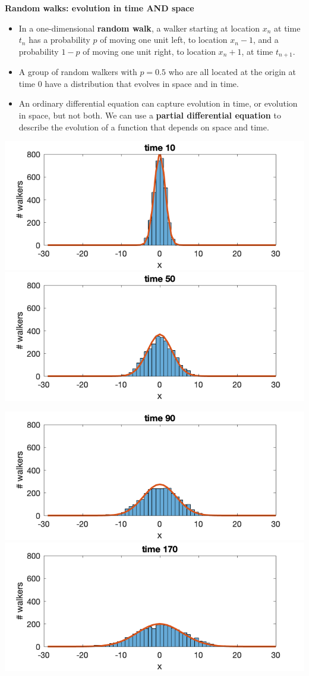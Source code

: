 \documentclass[12pt,letterpaper,noanswers]{exam}
\begin{document}
\noindent\textbf{Random walks: evolution in time AND space}
\begin{tcolorbox}
\begin{itemize}
\itemsep0em
    \item In a one-dimensional \textbf{random walk}, a walker starting at location $x_n$ at time $t_n$ has a probability $p$ of moving one unit left, to location $x_n - 1$, and a probability $1-p$ of moving one unit right, to location $x_n + 1$, at time $t_{n+1}$.
    \item A group of random walkers with $p=0.5$ who are all located at the origin at time $0$ have a distribution that evolves in space and in time.
    \item An ordinary differential equation can capture evolution in time, or evolution in space, but not both.  We can use a \textbf{partial differential equation} to describe the evolution of a function that depends on space and time.
\end{itemize}
\end{tcolorbox}
 

\includegraphics[width=0.45\linewidth]{img/C36p1a.png}
\includegraphics[width=0.45\linewidth]{img/C36p1b.png}


\includegraphics[width=0.45\linewidth]{img/C36p1c.png}
\includegraphics[width=0.45\linewidth]{img/C36p1d.png}
\end{document}
